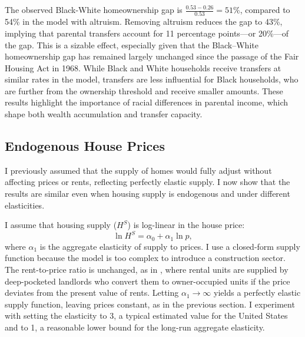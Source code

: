 \documentclass[12pt]{article}
\begin{document}
The observed Black-White homeownership gap is $\frac{0.53 - 0.26}{0.53} = 51\%$, compared to 54\% in the model with altruism. Removing altruism reduces the gap to 43\%, implying that parental transfers account for 11 percentage points---or 20\%---of the gap. This is a sizable effect, especially given that the Black–White homeownership gap has remained largely unchanged since the passage of the Fair Housing Act in 1968. While Black and White households receive transfers at similar rates in the model, transfers are less influential for Black households, who are further from the ownership threshold and receive smaller amounts. These results highlight the importance of racial differences in parental income, which shape both wealth accumulation and transfer capacity. 

\subsection{Endogenous House Prices}\label{sec:endoprice}
I previously assumed that the supply of homes would fully adjust without affecting prices or rents, reflecting perfectly elastic supply. I now show that the results are similar even when housing supply is endogenous and under different elasticities.

I assume that housing supply ($H^S$) is log-linear in the house price:
\begin{equation}
\label{eq:hsupply}
\ln H^S = \alpha_0 + \alpha_1 \ln p,
\end{equation}
where $\alpha_1$ is the aggregate elasticity of supply to prices. I use a closed-form supply function because the model is too complex to introduce a construction sector. The rent-to-price ratio is unchanged, as in \cite{Kaplan2020}, where rental units are supplied by deep-pocketed landlords who convert them to owner-occupied units if the price deviates from the present value of rents. Letting $\alpha_1\to\infty$ yields a perfectly elastic supply function, leaving prices constant, as in the previous section. I experiment with setting the elasticity to 3, a typical estimated value for the United States \cite[see e.g.,][]{saiz2010geographic,aastveit2023changing}and to 1, a reasonable lower bound for the long-run aggregate elasticity.
\end{document}

